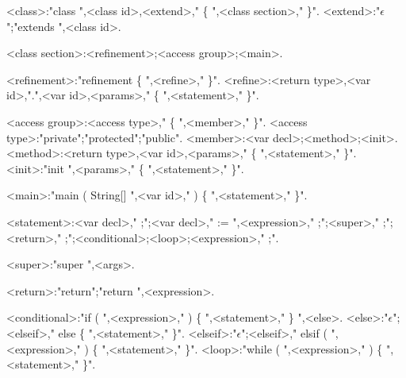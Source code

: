 \begin{grammar}

<class>:"class ",<class id>,<extend>," \{ ",<class section>,"{\small *} \}".
<extend>:"$\epsilon$";"extends ",<class id>.

<class section>:<refinement>;<access group>;<main>.

<refinement>:"refinement \{ ",<refine>,"{\small *} \}".
<refine>:<return type>,<var id>,".",<var id>,<params>," \{ ",<statement>,"{\small *} \}".

<access group>:<access type>," \{ ",<member>,"{\small *} \}".
<access type>:"private";"protected";"public".
<member>:<var decl>;<method>;<init>.
<method>:<return type>,<var id>,<params>," \{ ",<statement>,"{\small *} \}".
<init>:"init ",<params>," \{ ",<statement>,"{\small *} \}".

<main>:"main ( String[] ",<var id>," ) \{ ",<statement>,"{\small *} \}".

<statement>:<var decl>," ;";<var decl>," := ",<expression>," ;";<super>," ;";<return>," ;";<conditional>;<loop>;<expression>," ;".

<super>:"super ",<args>.

<return>:"return";"return ",<expression>.

<conditional>:"if ( ",<expression>," ) \{ ",<statement>,"{\small *} \} ",<else>.
<else>:"$\epsilon$";<elseif>," else \{ ",<statement>,"{\small *} \}".
<elseif>:"$\epsilon$";<elseif>," elsif ( ",<expression>," ) \{ ",<statement>,"{\small *} \}".
<loop>:"while ( ",<expression>," ) \{ ",<statement>,"{\small *} \}".


\end{grammar}
